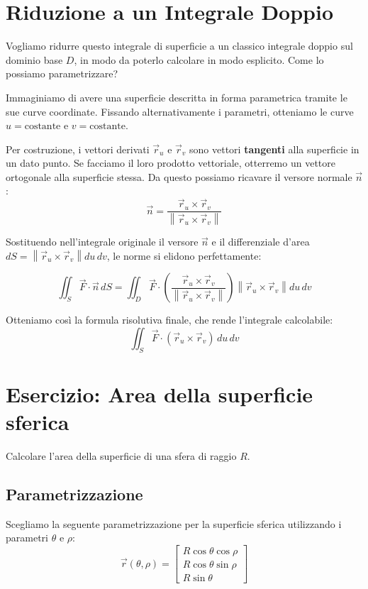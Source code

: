 \section{Riduzione a un Integrale Doppio}
Vogliamo ridurre questo integrale di superficie a un classico integrale doppio sul dominio base $D$, in modo da poterlo calcolare in modo esplicito. Come lo possiamo parametrizzare?

Immaginiamo di avere una superficie descritta in forma parametrica tramite le sue curve coordinate. Fissando alternativamente i parametri, otteniamo le curve $u = \text{costante}$ e $v = \text{costante}$.

Per costruzione, i vettori derivati $\vec{r}_u$ e $\vec{r}_v$ sono vettori \textbf{tangenti} alla superficie in un dato punto.
Se facciamo il loro prodotto vettoriale, otterremo un vettore ortogonale alla superficie stessa. Da questo possiamo ricavare il versore normale $\vec{n}$:
\[
\vec{n} = \frac{\vec{r}_u \times \vec{r}_v}{\left\| \vec{r}_u \times \vec{r}_v \right\|}
\]

Sostituendo nell'integrale originale il versore $\vec{n}$ e il differenziale d'area $dS = \left\| \vec{r}_u \times \vec{r}_v \right\| du \, dv$, le norme si elidono perfettamente:

\[
\iint_S \vec{F} \cdot \vec{n} \, dS = \iint_D \vec{F} \cdot \left( \frac{\vec{r}_u \times \vec{r}_v}{\left\| \vec{r}_u \times \vec{r}_v \right\|} \right) \left\| \vec{r}_u \times \vec{r}_v \right\| du \, dv
\]

Otteniamo così la formula risolutiva finale, che rende l'integrale calcolabile:
\[
\iint_S \vec{F} \cdot (\vec{r}_u \times \vec{r}_v) \, du \, dv
\]

\section{Esercizio: Area della superficie sferica}
Calcolare l'area della superficie di una sfera di raggio $R$.

\subsection*{Parametrizzazione}
Scegliamo la seguente parametrizzazione per la superficie sferica utilizzando i parametri $\theta$ e $\rho$:
\[
\vec{r}(\theta, \rho) =
\begin{bmatrix}
R \cos\theta \cos\rho \\
R \cos\theta \sin\rho \\
R \sin\theta
\end{bmatrix}
\]

